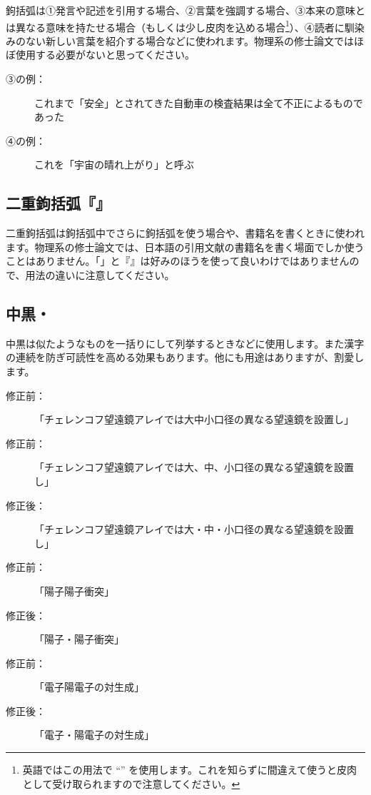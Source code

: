 鉤括弧は①発言や記述を引用する場合、②言葉を強調する場合、③本来の意味とは異なる意味を持たせる場合（もしくは少し皮肉を込める場合\footnote{英語ではこの用法で ``'' を使用します。これを知らずに間違えて使うと皮肉として受け取られますので注意してください。}）、④読者に馴染みのない新しい言葉を紹介する場合などに使われます。物理系の修士論文ではほぼ使用する必要がないと思ってください。

\begin{description}
\item[③の例：]これまで「安全」とされてきた自動車の検査結果は全て不正によるものであった
\item[④の例：]これを「宇宙の晴れ上がり」と呼ぶ
\end{description}

\subsection{二重鉤括弧『』}

二重鉤括弧は鉤括弧中でさらに鉤括弧を使う場合や、書籍名を書くときに使われます。物理系の修士論文では、日本語の引用文献の書籍名を書く場面でしか使うことはありません。「」と『』は好みのほうを使って良いわけではありませんので、用法の違いに注意してください。

\subsection{中黒・}

中黒は似たようなものを一括りにして列挙するときなどに使用します。また漢字の連続を防ぎ可読性を高める効果もあります。他にも用途はありますが、割愛します。

\begin{description}
\item[修正前：]「チェレンコフ望遠鏡アレイでは大中小口径の異なる望遠鏡を設置し」
\item[修正前：]「チェレンコフ望遠鏡アレイでは大、中、小口径の異なる望遠鏡を設置し」
\item[修正後：]「チェレンコフ望遠鏡アレイでは大・中・小口径の異なる望遠鏡を設置し」
\end{description}

\begin{description}
\item[修正前：]「陽子陽子衝突」
\item[修正後：]「陽子・陽子衝突」
\end{description}

\begin{description}
\item[修正前：]「電子陽電子の対生成」
\item[修正後：]「電子・陽電子の対生成」
\end{description}


